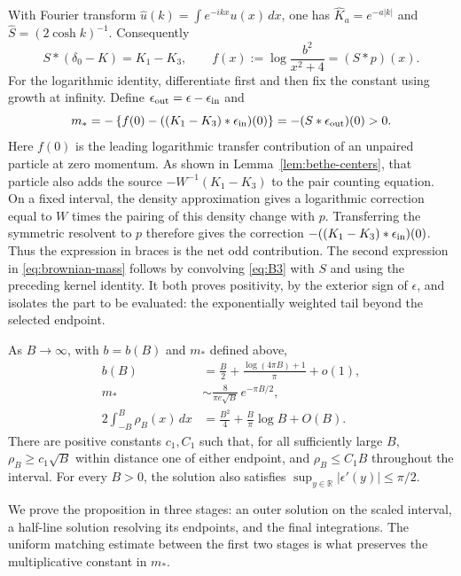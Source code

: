 With Fourier transform $\widehat u(k)=\int e^{-ikx}u(x)\,dx$, one has
$\widehat K_a=e^{-a|k|}$ and $\widehat S=(2\cosh k)^{-1}$.  Consequently
\[
 S*(\delta_0-K)=K_1-K_3,
 \qquad
 f(x):=\log\frac{b^2}{x^2+4}=(S*p)(x).
\]
For the logarithmic identity, differentiate first and then fix the
constant using growth at infinity.  Define $\epsilon_{\rm out}
=\epsilon-\epsilon_{\rm in}$ and
\begin{equation}
 m_*=-\left\{f(0)-((K_1-K_3)*\epsilon_{\rm in})(0)\right\}
       =-(S*\epsilon_{\rm out})(0)>0.
 \label{eq:brownian-mass}
\end{equation}
Here $f(0)$ is the leading logarithmic transfer contribution of an
unpaired particle at zero momentum.  As shown in Lemma~\ref{lem:bethe-centers}, that particle
also adds the source $-W^{-1}(K_1-K_3)$ to the pair counting equation.
On a fixed interval, the density approximation gives a logarithmic
correction equal to $W$ times the pairing of this density change with $p$.
Transferring the symmetric resolvent
to $p$ therefore gives the correction
$-((K_1-K_3)*\epsilon_{\rm in})(0)$.  Thus the expression in braces
is the net odd contribution.  The second expression in \eqref{eq:brownian-mass}
follows by convolving \eqref{eq:B3} with $S$ and using the preceding
kernel identity.  It both proves positivity, by the exterior sign of
$\epsilon$, and isolates the part to be evaluated: the exponentially
weighted tail beyond the selected endpoint.

\begin{proposition}
\label{prop:brownian-asymptotics}
As $B\to\infty$, with $b=b(B)$ and $m_*$ defined above,
\begin{equation}
 \begin{aligned}
 b(B)&=\frac B2+\frac{\log(4\pi B)+1}{\pi}+o(1),\\
 m_*&\sim\frac{8}{\pi e\sqrt B}\,e^{-\pi B/2},\\
 2\int_{-B}^B\rho_B(x)\,dx
       &=\frac{B^2}{4}+\frac B\pi\log B+O(B).
 \end{aligned}
 \label{eq:B5}
\end{equation}
There are positive constants $c_1,C_1$ such that, for all sufficiently
large $B$, $\rho_B\ge c_1\sqrt B$ within distance one of either endpoint,
and $\rho_B\le C_1B$ throughout the interval.  For every $B>0$, the
solution also satisfies $\sup_{y\in\mathbb R}|\epsilon'(y)|\le\pi/2$.
\end{proposition}

We prove the proposition in three stages: an outer solution on the scaled
interval, a half-line solution resolving its endpoints, and the final
integrations.  The uniform matching estimate between the first two stages
is what preserves the multiplicative constant in $m_*$.


